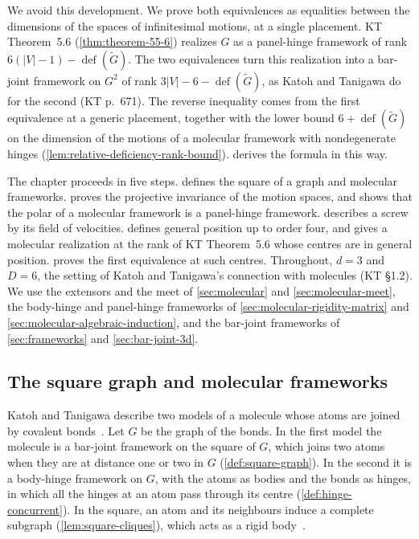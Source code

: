 We avoid this development. We prove both equivalences as equalities
between the dimensions of the spaces of infinitesimal motions, at a
single placement. KT Theorem~5.6
(\cref{thm:theorem-55-6}) realizes $G$ as a panel-hinge framework of rank
$6(|V| - 1) - \operatorname{def}(\tilde G)$. The two equivalences turn this
realization into a bar-joint framework on $G^2$ of rank
$3|V| - 6 - \operatorname{def}(\tilde G)$, as Katoh and Tanigawa do for
the second (KT p.~671). The reverse inequality comes from the first
equivalence at a generic placement, together with the lower bound
$6 + \operatorname{def}(\tilde G)$ on the dimension of the motions of a
molecular framework with nondegenerate hinges
(\cref{lem:relative-deficiency-rank-bound}).
 derives the formula in this way.

The chapter proceeds in five steps. 
defines the square of a graph and molecular frameworks.
 proves the projective invariance
of the motion spaces, and shows that the polar of a molecular framework
is a panel-hinge framework. 
describes a screw by its field of velocities.
 defines general position
up to order four, and gives a molecular realization at the rank of KT
Theorem~5.6 whose centres are in general position.
 proves the first equivalence
at such centres. Throughout, $d = 3$ and $D = 6$, the setting of Katoh
and Tanigawa's connection with molecules (KT \S1.2). We use the extensors
and the meet of \cref{sec:molecular} and \cref{sec:molecular-meet}, the
body-hinge and panel-hinge frameworks of
\cref{sec:molecular-rigidity-matrix} and
\cref{sec:molecular-algebraic-induction}, and the bar-joint frameworks of
\cref{sec:frameworks} and \cref{sec:bar-joint-3d}.

\subsection{The square graph and molecular frameworks}
\label{sec:molecule-modelling-defs}

Katoh and Tanigawa describe two models of a molecule whose atoms are
joined by covalent bonds~\cite[\S1.2]{katohTanigawa2011}. Let $G$ be
the graph of the bonds. In the first model the molecule is a bar-joint
framework on the square of $G$, which joins two atoms when they are at
distance one or two in $G$ (\cref{def:square-graph}). In the second it
is a body-hinge framework on $G$, with the atoms as bodies and the
bonds as hinges, in which all the hinges at an atom pass through its
centre (\cref{def:hinge-concurrent}). In the square, an atom and its
neighbours induce a complete subgraph (\cref{lem:square-cliques}),
which acts as a rigid body~\cite[\S2.1]{jacksonJordan2008}.

